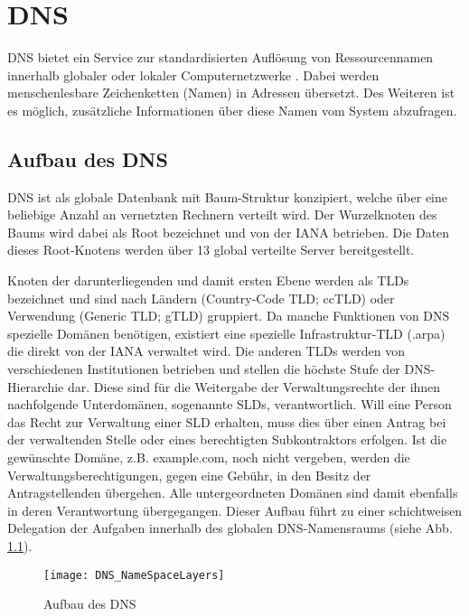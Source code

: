 \chapter{DNS}
\label{chap:dns}
DNS bietet ein Service zur standardisierten Auflösung von Ressourcennamen innerhalb globaler oder lokaler Computernetzwerke \cite{rfc1035}. Dabei werden menschenlesbare Zeichenketten (Namen) in Adressen übersetzt. Des Weiteren ist es möglich, zusätzliche Informationen über diese Namen vom System abzufragen.

\section{Aufbau des DNS}
DNS ist als globale Datenbank mit Baum-Struktur konzipiert, welche über eine beliebige Anzahl an vernetzten Rechnern verteilt wird. Der Wurzelknoten des Baums wird dabei als Root bezeichnet und von der \ac{IANA} betrieben. Die Daten dieses Root-Knotens werden über 13 global verteilte Server bereitgestellt. 

Knoten der darunterliegenden und damit ersten Ebene werden als \acp{TLD} bezeichnet und sind nach Ländern (Country-Code TLD; ccTLD) oder Verwendung (Generic TLD; gTLD) gruppiert. Da manche Funktionen von DNS spezielle Domänen benötigen, existiert eine spezielle Infrastruktur-\ac{TLD} (.arpa) die direkt von der \ac{IANA} verwaltet wird. Die anderen TLDs werden von verschiedenen Institutionen betrieben und stellen die höchste Stufe der DNS-Hierarchie dar. Diese sind für die Weitergabe der Verwaltungsrechte der ihnen nachfolgende Unterdomänen, sogenannte \acp{SLD}, verantwortlich. Will eine Person das Recht zur Verwaltung einer \ac{SLD} erhalten, muss dies über einen Antrag bei der verwaltenden Stelle oder eines berechtigten Subkontraktors erfolgen. Ist die gewünschte Domäne, z.B. example.com, noch nicht vergeben, werden die Verwaltungsberechtigungen, gegen eine Gebühr, in den Besitz der Antragstellenden übergehen. Alle untergeordneten Domänen sind damit ebenfalls in deren Verantwortung übergegangen. Dieser Aufbau führt zu einer schichtweisen Delegation der Aufgaben innerhalb des globalen DNS-Namensraums (siehe Abb. \ref{img:dnsnamespace}). 

\begin{figure}[!hb]
    \centering
    \texttt{[image: DNS\_NameSpaceLayers]}
    \caption{Aufbau des DNS}
    \label{img:dnsnamespace}
\end{figure}

